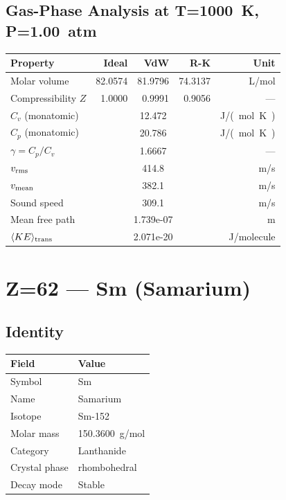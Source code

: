 \documentclass[11pt,a4paper]{article}
\begin{document}
\subsection{Gas-Phase Analysis at T=\SI{1000}{K}, P=\SI{1.00}{atm}}
\begin{tabular}{lrrrr}
  \toprule
  Property & Ideal & VdW & R-K & Unit \\
  \midrule
  Molar volume & 82.0574 & 81.9796 & 74.3137 & \si{L/mol} \\
  Compressibility $Z$ & 1.0000 & 0.9991 & 0.9056 & --- \\
  \midrule
  $C_v$ (monatomic) & \multicolumn{3}{c}{12.472} & \si{J/(mol.K)} \\
  $C_p$ (monatomic) & \multicolumn{3}{c}{20.786} & \si{J/(mol.K)} \\
  $\gamma = C_p/C_v$ & \multicolumn{3}{c}{1.6667} & --- \\
  $v_{\rm rms}$ & \multicolumn{3}{c}{414.8} & \si{m/s} \\
  $v_{\rm mean}$ & \multicolumn{3}{c}{382.1} & \si{m/s} \\
  Sound speed & \multicolumn{3}{c}{309.1} & \si{m/s} \\
  Mean free path & \multicolumn{3}{c}{1.739e-07} & \si{m} \\
  $\langle KE \rangle_{\rm trans}$ & \multicolumn{3}{c}{2.071e-20} & \si{J/molecule} \\
  \bottomrule
\end{tabular}

\newpage

\section{Z=62 --- Sm (Samarium)}
\label{sec:Z62}

\subsection{Identity}
\begin{tabular}{ll}
  \toprule
  Field & Value \\
  \midrule
  Symbol & Sm \\
  Name & Samarium \\
  Isotope & Sm-152 \\
  Molar mass & \SI{150.3600}{g/mol} \\
  Category & Lanthanide \\
  Crystal phase & rhombohedral \\
  Decay mode & Stable \\
  \bottomrule
\end{tabular}
\end{document}
